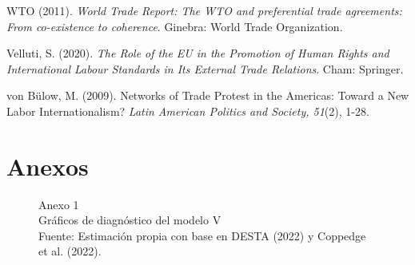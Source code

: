 \documentclass[a4paper]{tufte-handout}
\begin{document}
\begin{list}{}
\item{\small WTO (2011). {\itshape World Trade Report: The WTO and preferential trade agreements: From co-existence to coherence}. Ginebra: World Trade Organization.}

\item{\small Velluti, S. (2020). {\itshape The Role of the EU in the Promotion of Human Rights and International Labour Standards in Its External Trade Relations}. Cham: Springer.}

\item{\small von Bülow, M. (2009). Networks of Trade Protest in the Americas: Toward a New Labor Internationalism? {\itshape Latin American Politics and Society, 51}(2), 1-28.}

\end{list}


\section{{\normalfont Anexos}}


\begin{figure}[h!]
\captionsetup[subfigure]{labelformat=empty}
  \centering
  \smallskip\noindent\small Anexo 1 \\ Gráficos de diagnóstico del modelo V
  \\ \smallskip\noindent\scriptsize Fuente: Estimación propia con base en DESTA (2022) y Coppedge et al. (2022).
\end{figure}
\pagebreak
\end{document}
